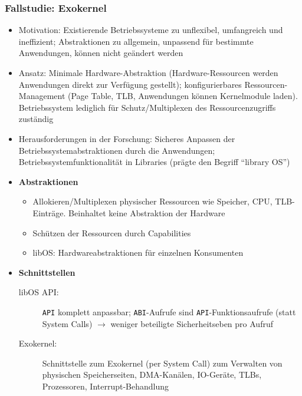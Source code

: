 \subsubsection{Fallstudie: Exokernel}
\begin{itemize}
	\item Motivation: Existierende Betriebssysteme zu unflexibel, umfangreich und ineffizient; Abstraktionen zu allgemein, unpassend für bestimmte Anwendungen, können nicht geändert werden
	\item Ansatz: Minimale Hardware-Abstraktion (Hardware-Ressourcen werden Anwendungen direkt zur Verfügung gestellt); konfigurierbares Ressourcen-Management (Page Table, TLB, Anwendungen können Kernelmodule laden). Betriebssystem lediglich für Schutz/Multiplexen des Ressourcenzugriffs zuständig
	\item Herausforderungen in der Forschung: Sicheres Anpassen der Betriebssystemabstraktionen durch die Anwendungen; Betriebssystemfunktionalität in Libraries (prägte den Begriff "`library OS"')
	\item \textbf{Abstraktionen}
	\begin{itemize}
		\item Allokieren/Multiplexen physischer Ressourcen wie Speicher, CPU, TLB-Einträge. Beinhaltet keine Abstraktion der Hardware
		\item Schützen der Ressourcen durch Capabilities
		\item libOS: Hardwareabstraktionen für einzelnen Konsumenten
	\end{itemize}
	\item \textbf{Schnittstellen}
	\begin{description}
		\item[libOS API:] \texttt{API} komplett anpassbar; \texttt{ABI}-Aufrufe sind \texttt{API}-Funktionsaufrufe (statt System Calls) \(\rightarrow\) weniger beteiligte Sicherheitseben pro Aufruf
		\item[Exokernel:] Schnittstelle zum Exokernel (per System Call) zum Verwalten von physischen Speicherseiten, DMA-Kanälen, IO-Geräte, TLBs, Prozessoren, Interrupt-Behandlung
	\end{description}
\end{itemize}


